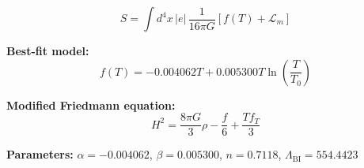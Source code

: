 
\begin{equation}
  S = \int d^4x \, |e| \, \frac{1}{16\pi G} \left[ f(T) + \mathcal{L}_m \right]
\end{equation}

\textbf{Best-fit model:}
\begin{equation}
  f(T) = -0.004062 T + 0.005300 T \ln\!\left(\frac{T}{T_0}\right)
\end{equation}

\textbf{Modified Friedmann equation:}
\begin{equation}
  H^2 = \frac{8\pi G}{3} \rho - \frac{f}{6} + \frac{T f_T}{3}
\end{equation}

\textbf{Parameters:}
$\alpha = -0.004062$, \quad
$\beta = 0.005300$, \quad
$n = 0.7118$, \quad
$\Lambda_{\text{BI}} = 554.4423$